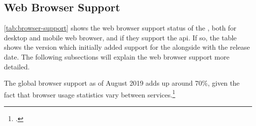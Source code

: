 \subsection{Web Browser Support}

\autoref{tab:browser-support} shows the web browser support status of the \wa{}, both for desktop and mobile web browser, and if they support the \gls{api}. If so, the table shows the version which initially added support for the \wa{} alongside with the release date. The following subsections will explain the web browser support more detailed.

The global browser support as of August 2019 adds up around 70\%, given the fact that browser usage statistics vary between services.\footcites[The obtained data is available in the Appendix \autoref{sec:stats}, see][]{statcounter-global}

